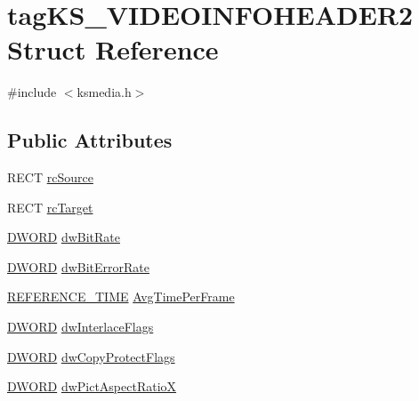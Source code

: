 \hypertarget{structtag_k_s___v_i_d_e_o_i_n_f_o_h_e_a_d_e_r2}{}\section{tag\+K\+S\+\_\+\+V\+I\+D\+E\+O\+I\+N\+F\+O\+H\+E\+A\+D\+E\+R2 Struct Reference}
\label{structtag_k_s___v_i_d_e_o_i_n_f_o_h_e_a_d_e_r2}


{\ttfamily \#include $<$ksmedia.\+h$>$}

\subsection*{Public Attributes}
\begin{DoxyCompactItemize}
\item 
R\+E\+CT \hyperlink{structtag_k_s___v_i_d_e_o_i_n_f_o_h_e_a_d_e_r2_a5357001d271e6d7efac044d87bb543e1}{rc\+Source}
\item 
R\+E\+CT \hyperlink{structtag_k_s___v_i_d_e_o_i_n_f_o_h_e_a_d_e_r2_adc53d58d66dd822a623bcb24153f7c57}{rc\+Target}
\item 
\hyperlink{mapinls_8h_ad342ac907eb044443153a22f964bf0af}{D\+W\+O\+RD} \hyperlink{structtag_k_s___v_i_d_e_o_i_n_f_o_h_e_a_d_e_r2_a4fcd215cce825d2b14a4b1837f43fad8}{dw\+Bit\+Rate}
\item 
\hyperlink{mapinls_8h_ad342ac907eb044443153a22f964bf0af}{D\+W\+O\+RD} \hyperlink{structtag_k_s___v_i_d_e_o_i_n_f_o_h_e_a_d_e_r2_a45a82ff0ef759672eadbcd071c4e45d4}{dw\+Bit\+Error\+Rate}
\item 
\hyperlink{ksmedia_8h_a83927f70641d4e9a344563bd9ddb15ae}{R\+E\+F\+E\+R\+E\+N\+C\+E\+\_\+\+T\+I\+ME} \hyperlink{structtag_k_s___v_i_d_e_o_i_n_f_o_h_e_a_d_e_r2_a89fece47a50e186aac85a270397a3af3}{Avg\+Time\+Per\+Frame}
\item 
\hyperlink{mapinls_8h_ad342ac907eb044443153a22f964bf0af}{D\+W\+O\+RD} \hyperlink{structtag_k_s___v_i_d_e_o_i_n_f_o_h_e_a_d_e_r2_af73939ce9c35b0e273a8f71e1a53cc9f}{dw\+Interlace\+Flags}
\item 
\hyperlink{mapinls_8h_ad342ac907eb044443153a22f964bf0af}{D\+W\+O\+RD} \hyperlink{structtag_k_s___v_i_d_e_o_i_n_f_o_h_e_a_d_e_r2_ae50bc9d96a74da1b265e5d51a972eb81}{dw\+Copy\+Protect\+Flags}
\item 
\hyperlink{mapinls_8h_ad342ac907eb044443153a22f964bf0af}{D\+W\+O\+RD} \hyperlink{structtag_k_s___v_i_d_e_o_i_n_f_o_h_e_a_d_e_r2_acf7e354d9986a49501035b33f3d826ef}{dw\+Pict\+Aspect\+RatioX}

\end{DoxyCompactItemize}

